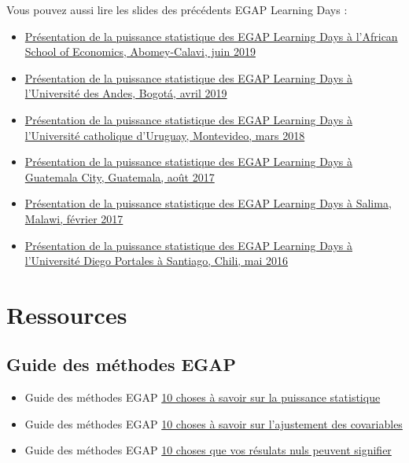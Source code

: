 \documentclass[
  12pt,
]{book}
\begin{document}
Vous pouvez aussi lire les slides des précédents EGAP Learning Days :

\begin{itemize}
\item
  \href{https://egap.github.io/learningdays-resources/Slides/Examples/power-benin.pdf}{Présentation de la puissance statistique des EGAP Learning Days à l'African School of Economics, Abomey-Calavi, juin 2019}
\item
  \href{https://egap.github.io/learningdays-resources/Slides/Examples/power-bogota.pdf}{Présentation de la puissance statistique des EGAP Learning Days à l'Université des Andes, Bogotá, avril 2019}
\item
  \href{https://egap.github.io/learningdays-resources/Slides/Examples/power-montevideo.pdf}{Présentation de la puissance statistique des EGAP Learning Days à l'Université catholique d'Uruguay, Montevideo, mars 2018}
\item
  \href{https://egap.github.io/learningdays-resources/Slides/Examples/power-guatemala.html}{Présentation de la puissance statistique des EGAP Learning Days à Guatemala City, Guatemala, août 2017}
\item
  \href{https://egap.github.io/learningdays-resources/Slides/Examples/power-malawi.pdf}{Présentation de la puissance statistique des EGAP Learning Days à Salima, Malawi, février 2017}
\item
  \href{https://egap.github.io/learningdays-resources/Slides/Examples/power-santiago.pdf}{Présentation de la puissance statistique des EGAP Learning Days à l'Université Diego Portales à Santiago, Chili, mai 2016}
\end{itemize}

\hypertarget{ressources-5}{%
\section{Ressources}\label{ressources-5}}

\hypertarget{guide-des-muxe9thodes-egap-5}{%
\subsection{Guide des méthodes EGAP}\label{guide-des-muxe9thodes-egap-5}}

\begin{itemize}
\item
  Guide des méthodes EGAP \href{https://egap.org/resource/10-things-you-need-know-about-statistical-power/}{10 choses à savoir sur la puissance statistique}
\item
  Guide des méthodes EGAP \href{https://egap.org/resource/10-things-to-know-about-covariate-adjustment/}{10 choses à savoir sur l'ajustement des covariables}
\item
  Guide des méthodes EGAP \href{https://egap.org/resource/10-things-your-null-result-might-mean/}{10 choses que vos résulats nuls peuvent signifier}
\end{itemize}
\end{document}
